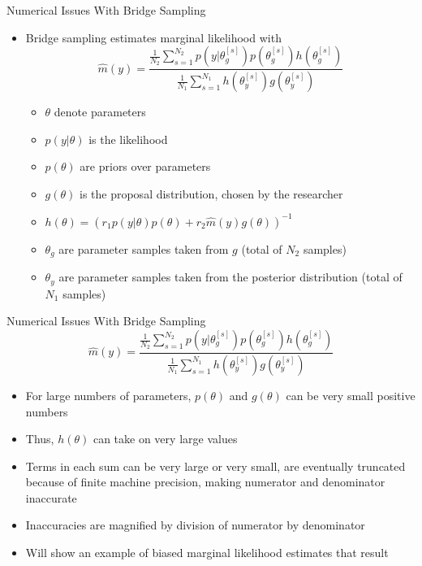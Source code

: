 \documentclass{beamer}
\begin{document}
\begin{frame}{Numerical Issues With Bridge Sampling}
\begin{itemize}
	\item Bridge sampling estimates marginal likelihood with $$\hat{m}(y) = \frac{\frac{1}{N_2}\sum_{s=1}^{N_2} p\left(y|\theta_{g}^{[s]}\right)p\left(\theta_{g}^{[s]}\right)h\left(\theta_{g}^{[s]}\right)}{\frac{1}{N_1}\sum_{s=1}^{N_1} h\left(\theta_{y}^{[s]}\right)g\left(\theta_{y}^{[s]}\right)}$$
		\begin{itemize}
			\item $\theta$ denote parameters
			\item $p(y|\theta)$ is the likelihood
			\item $p(\theta)$ are priors over parameters
			\item $g(\theta)$ is the proposal distribution, chosen by the researcher
			\item $h(\theta) = \left(r_1 p(y|\theta) p(\theta) + r_2 \hat{m}(y) g(\theta)\right)^{-1}$
			\item $\theta_g$ are parameter samples taken from $g$ (total of $N_2$ samples)
			\item $\theta_y$ are parameter samples taken from the posterior distribution (total of $N_1$ samples)
		\end{itemize}
\end{itemize}
\end{frame}

\begin{frame}{Numerical Issues With Bridge Sampling}
$$\hat{m}(y) = \frac{\frac{1}{N_2}\sum_{s=1}^{N_2} p\left(y|\theta_{g}^{[s]}\right)p\left(\theta_{g}^{[s]}\right)h\left(\theta_{g}^{[s]}\right)}{\frac{1}{N_1}\sum_{s=1}^{N_1} h\left(\theta_{y}^{[s]}\right)g\left(\theta_{y}^{[s]}\right)}$$
\begin{itemize}
	\item For large numbers of parameters, $p(\theta)$ and $g(\theta)$ can be very small positive numbers
	\item Thus, $h(\theta)$ can take on very large values
	\item Terms in each sum can be very large or very small, are eventually truncated because of finite machine precision, making numerator and denominator inaccurate
	\item Inaccuracies are magnified by division of numerator by denominator
	\item Will show an example of biased marginal likelihood estimates that result
\end{itemize}
\end{frame}
\end{document}
